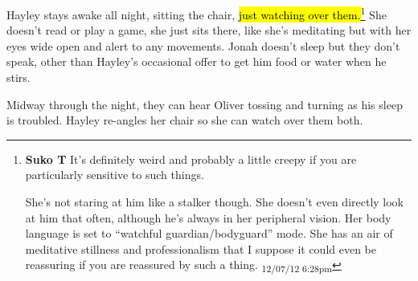 Hayley stays awake all night, sitting the chair, \hl{just watching over them.}\footnote{\textbf{Suko T }It's definitely weird and probably a little creepy if you are particularly sensitive to such things. 

She's not staring at him like a stalker though.  She doesn't even directly look at him that often, although he's always in her peripheral vision.  Her body language is set to ``watchful guardian/bodyguard'' mode. She has an air of meditative stillness and professionalism that I suppose it could even be reassuring if you are reassured by such a thing. \textsubscript{12/07/12 6:28pm}}  She doesn't read or play a game, she just sits there, like she's meditating but with her eyes wide open and alert to any movements.  Jonah doesn't sleep but they don't speak, other than Hayley's occasional offer to get him food or water when he stirs.



Midway through the night, they can hear Oliver tossing and turning as his sleep is troubled.  Hayley re-angles her chair so she can watch over them both.






